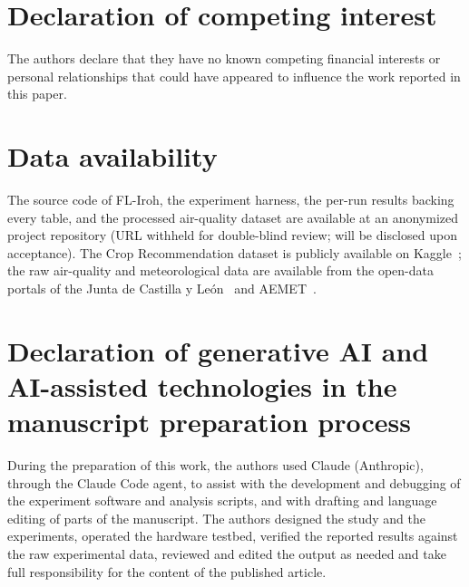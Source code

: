 \documentclass[a4paper,fleqn]{cas-dc}
\begin{document}
\section*{Declaration of competing interest}
The authors declare that they have no known competing financial interests or personal relationships that could have appeared to influence the work reported in this paper.

\section*{Data availability}
The source code of FL-Iroh, the experiment harness, the per-run results backing every table, and the processed air-quality dataset are available at an anonymized project repository (URL withheld for double-blind review; will be disclosed upon acceptance). The Crop Recommendation dataset is publicly available on Kaggle~\cite{cropdataset}; the raw air-quality and meteorological data are available from the open-data portals of the Junta de Castilla y Le\'on~\cite{cyl2023airquality} and AEMET~\cite{aemet2023}.

\section*{Declaration of generative AI and AI-assisted technologies in the manuscript preparation process}
During the preparation of this work, the authors used Claude (Anthropic), through the Claude Code agent, to assist with the development and debugging of the experiment software and analysis scripts, and with drafting and language editing of parts of the manuscript. The authors designed the study and the experiments, operated the hardware testbed, verified the reported results against the raw experimental data, reviewed and edited the output as needed and take full responsibility for the content of the published article.
\end{document}
